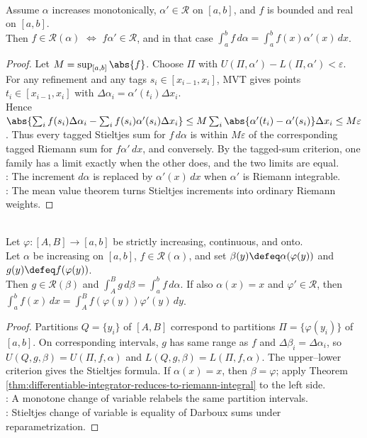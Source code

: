 \begin{theorem} \label{thm:differentiable-integrator-reduces-to-riemann-integral} \\
Assume $\alpha$ increases monotonically, $\alpha'\in\mathcal{R}$ on $[a,b]$, and $f$ is bounded and real on $[a,b]$.\\
Then $f\in\mathcal{R}(\alpha)$ $\Longleftrightarrow$ $f\alpha'\in\mathcal{R}$, and in that case $\int_a^b f\,d\alpha=\int_a^b f(x)\alpha'(x)\,dx$.
\begin{proof}
Let $M=\sup_{[a,b]}\abs{f}$. Choose $\Pi$ with $U(\Pi,\alpha')-L(\Pi,\alpha')<\varepsilon$.\\
For any refinement and any tags $s_i\in[x_{i-1},x_i]$, MVT gives points $t_i\in[x_{i-1},x_i]$ with $\Delta\alpha_i=\alpha'(t_i)\Delta x_i$.\\
Hence $\abs{\sum_i f(s_i)\Delta\alpha_i-\sum_i f(s_i)\alpha'(s_i)\Delta x_i} \leq M\sum_i\abs{\alpha'(t_i)-\alpha'(s_i)}\Delta x_i \leq M\varepsilon$. Thus every tagged Stieltjes sum for $f\,d\alpha$ is within $M\varepsilon$ of the corresponding tagged Riemann sum for $f\alpha'\,dx$, and conversely. By the tagged-sum criterion, one family has a limit exactly when the other does, and the two limits are equal.\\
: The increment $d\alpha$ is replaced by $\alpha'(x)\,dx$ when $\alpha'$ is Riemann integrable.\\
: The mean value theorem turns Stieltjes increments into ordinary Riemann weights.
\end{proof}
\end{theorem}

\begin{theorem} \label{thm:riemann-stieltjes-change-of-variable} \\
Let $\varphi:[A,B]\to[a,b]$ be strictly increasing, continuous, and onto.\\
Let $\alpha$ be increasing on $[a,b]$, $f\in\mathcal{R}(\alpha)$, and set $\beta(y)\defeq\alpha(\varphi(y))$ and $g(y)\defeq f(\varphi(y))$.\\
Then $g\in\mathcal{R}(\beta)$ and $\int_A^B g\,d\beta=\int_a^b f\,d\alpha$. If also $\alpha(x)=x$ and $\varphi'\in\mathcal{R}$, then $\int_a^b f(x)\,dx=\int_A^B f(\varphi(y))\varphi'(y)\,dy$.
\begin{proof}
Partitions $Q=\{y_i\}$ of $[A,B]$ correspond to partitions $\Pi=\{\varphi(y_i)\}$ of $[a,b]$. On corresponding intervals, $g$ has same range as $f$ and $\Delta\beta_i=\Delta\alpha_i$, so $U(Q,g,\beta)=U(\Pi,f,\alpha)$ and $L(Q,g,\beta)=L(\Pi,f,\alpha)$. The upper--lower criterion gives the Stieltjes formula. If $\alpha(x)=x$, then $\beta=\varphi$; apply Theorem \ref{thm:differentiable-integrator-reduces-to-riemann-integral} to the left side.\\
: A monotone change of variable relabels the same partition intervals.\\
: Stieltjes change of variable is equality of Darboux sums under reparametrization.
\end{proof}
\end{theorem}
